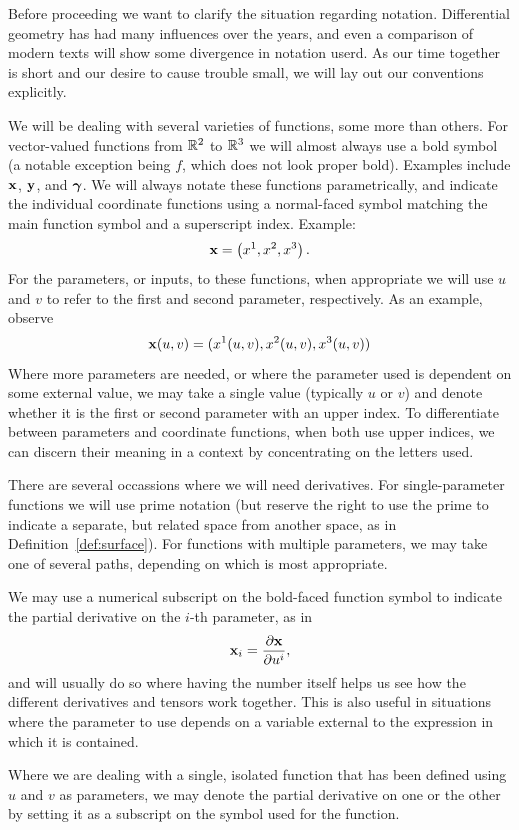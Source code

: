   \begin{unno_rem}
    Before proceeding we want to clarify the situation regarding notation. Differential geometry has had many influences over the years, and even a comparison of modern texts will show some divergence in notation userd. As our time together is short and our desire to cause trouble small, we will lay out our conventions explicitly.

    We will be dealing with several varieties of functions, some more than others. For vector-valued functions from $\mathbb{R}^2$ to $\mathbb{R}^3$ we will almost always use a bold symbol (a notable exception being $f$, which does not look proper bold). Examples include $\mathbf{x}$, $\mathbf{y}$, and $\boldsymbol{\gamma}$. We will always notate these functions parametrically, and indicate the individual coordinate functions using a normal-faced symbol matching the main function symbol and a superscript index. Example:
    \[
      \mathbf{x} = \left(x^1, x^2, x^3\right).
    \]
    For the parameters, or inputs, to these functions, when appropriate we will use $u$ and $v$ to refer to the first and second parameter, respectively. As an example, observe
    \[
      \mathbf{x}(u, v) = (x^1(u, v), x^2(u, v), x^3(u, v))
    \]
    Where more parameters are needed, or where the parameter used is dependent on some external value, we may take a single value (typically $u$ or $v$) and denote whether it is the first or second parameter with an upper index. To differentiate between parameters and coordinate functions, when both use upper indices, we can discern their meaning in a context by concentrating on the letters used. 

    There are several occassions where we will need derivatives. For single-parameter functions we will use prime notation (but reserve the right to use the prime to indicate a separate, but related space from another space, as in Definition~\ref{def:surface}). For functions with multiple parameters, we may take one of several paths, depending on which is most appropriate.

    We may use a numerical subscript on the bold-faced function symbol to indicate the partial derivative on the $i$-th parameter, as in 
    \[
      \mathbf{x}_i = \frac{\partial \mathbf{x}}{\partial u^i},
    \]
    and will usually do so where having the number itself helps us see how the different derivatives and tensors work together. This is also useful in situations where the parameter to use depends on a variable external to the expression in which it is contained.

    Where we are dealing with a single, isolated function that has been defined using $u$ and $v$ as parameters, we may denote the partial derivative on one or the other by setting it as a subscript on the symbol used for the function.
  \end{unno_rem}

